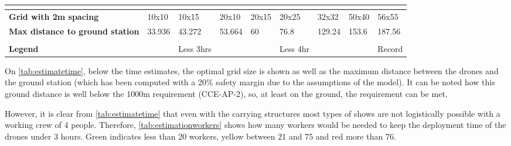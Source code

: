 \begin{table}[h]
{\begin{tabular}{lllllllll}
\textbf{} &  &  &  &  &  &  &  &  \\ \hline
\multicolumn{1}{|l|}{\textbf{Grid with 2m spacing}} & \multicolumn{1}{l|}{10x10} & \multicolumn{1}{l|}{10x15} & \multicolumn{1}{l|}{20x10} & \multicolumn{1}{l|}{20x15} & \multicolumn{1}{l|}{20x25} & \multicolumn{1}{l|}{32x32} & \multicolumn{1}{l|}{50x40} & \multicolumn{1}{l|}{56x55} \\ \hline
\multicolumn{1}{|l|}{\textbf{Max distance to ground station}} & \multicolumn{1}{l|}{33.936} & \multicolumn{1}{l|}{43.272} & \multicolumn{1}{l|}{53.664} & \multicolumn{1}{l|}{60} & \multicolumn{1}{l|}{76.8} & \multicolumn{1}{l|}{129.24} & \multicolumn{1}{l|}{153.6} & \multicolumn{1}{l|}{187.56} \\ \hline
\textbf{} &  &  &  &  &  &  &  &  \\ \hline
\multicolumn{1}{|l|}{\textbf{Legend}} & \multicolumn{1}{l|}{\cellcolor[HTML]{E2EFDA}} & \multicolumn{1}{l|}{Less 3hrs} & \multicolumn{1}{l|}{} & \multicolumn{1}{l|}{\cellcolor[HTML]{FFF2CC}} & \multicolumn{1}{l|}{Less 4hr} & \multicolumn{1}{l|}{} & \multicolumn{1}{l|}{\cellcolor[HTML]{D6DCE4}} & \multicolumn{1}{l|}{Record} \\ \hline
\end{tabular}%
}
\end{table}

On \autoref{tab:estimatetime}, below the time estimates, the optimal grid size is shown as well as the maximum distance between the drones and the ground station (which has been computed with a 20\% safety margin due to the assumptions of the model). It can be noted how this ground distance is well below the 1000m requirement (CCE-AP-2), so, at least on the ground, the requirement can be met. 

However, it is clear from \autoref{tab:estimatetime} that even with the carrying structures most types of shows are not logistically possible with a working crew of 4 people. Therefore, \autoref{tab:estimationworkers} shows how many workers would be needed to keep the deployment time of the drones under 3 hours.  Green indicates less than 20 workers, yellow between 21 and 75 and red more than 76.

